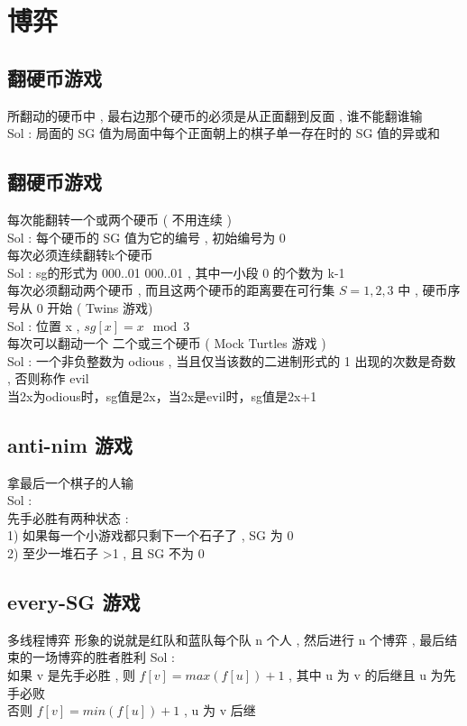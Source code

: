 \section{博弈}
\subsection{翻硬币游戏}
所翻动的硬币中 , 最右边那个硬币的必须是从正面翻到反面 , 谁不能翻谁输 \\
Sol : 局面的 SG 值为局面中每个正面朝上的棋子单一存在时的 SG 值的异或和 \\
\subsection{翻硬币游戏}
每次能翻转一个或两个硬币 ( 不用连续 ) \\
Sol : 每个硬币的 SG 值为它的编号 , 初始编号为 0 \\
每次必须连续翻转k个硬币 \\
Sol : sg的形式为 000..01 000..01 , 其中一小段 0 的个数为 k-1 \\
每次必须翻动两个硬币 , 
而且这两个硬币的距离要在可行集 $ S={1,2,3} $ 中 , 
硬币序号从 0 开始 ( Twins 游戏) \\
Sol : 位置 x , $ sg[x] = x \mod 3 $ \\
每次可以翻动一个 二个或三个硬币 (  Mock Turtles 游戏 ) \\
Sol : 一个非负整数为 odious , 
当且仅当该数的二进制形式的 1 出现的次数是奇数 , 否则称作 evil \\
当2x为odious时，sg值是2x，当2x是evil时，sg值是2x+1 \\

\subsection{anti-nim 游戏}
拿最后一个棋子的人输 \\
Sol : \\
先手必胜有两种状态 : \\
1) 如果每一个小游戏都只剩下一个石子了 , SG 为 0 \\
2) 至少一堆石子 >1 , 且 SG 不为 0 \\

\subsection{ every-SG 游戏}
多线程博弈 
形象的说就是红队和蓝队每个队 n 个人 , 
然后进行 n 个博弈 , 
最后结束的一场博弈的胜者胜利
Sol : \\
如果 v 是先手必胜 , 则 $ f[v]=max(f[u])+1$ 
, 其中 u 为 v 的后继且 u 为先手必败 \\
否则 $ f[v]=min(f[u])+1 $ , u 为 v 后继 

